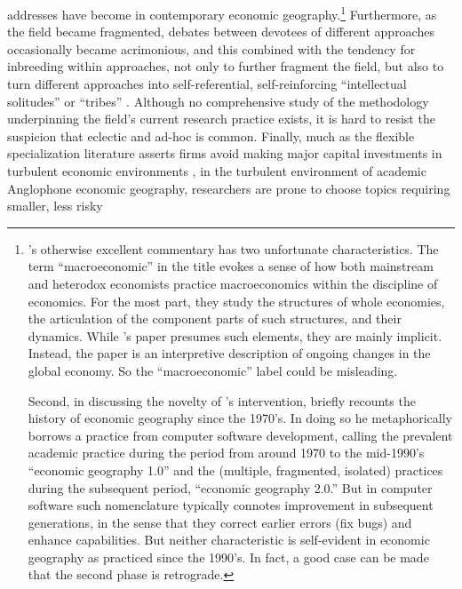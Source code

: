 addresses have become in contemporary economic geography.\footnote{\label{fn:macroeconomic}\citeauthor{peck2016macroeconomic}'s otherwise
excellent commentary has two unfortunate characteristics. The term
``macroeconomic'' in the title evokes a sense of how both mainstream
and heterodox economists practice macroeconomics within the discipline
of economics. For the most part, they study the structures of whole
economies, the articulation of the component parts of such structures,
and their dynamics. While \citeauthor{hudson2016risingpowers}'s paper
presumes such elements, they are mainly implicit. Instead, the paper
is an interpretive description of ongoing changes in the global economy.
So the ``macroeconomic'' label could be misleading.

Second, in discussing the novelty of \citeauthor{hudson2016risingpowers}'s
intervention, \citeauthor{Peck_2016_Macroeconomic} briefly recounts
the history of economic geography since the 1970's. In doing so he
metaphorically borrows a practice from computer software development,
calling the prevalent academic practice during the period from around
1970 to the mid-1990's ``economic geography 1.0'' and the (multiple,
fragmented, isolated) practices during the subsequent period, ``economic
geography 2.0.'' But in computer software such nomenclature typically
connotes improvement in subsequent generations, in the sense that
they correct earlier errors (fix bugs) and enhance capabilities. But
neither characteristic is self-evident in economic geography as practiced
since the 1990's. In fact, a good case can be made that the second
phase is retrograde. } Furthermore, as the field became fragmented, debates between devotees
of different approaches occasionally became acrimonious, and this
combined with the tendency for inbreeding within approaches, not only
to further fragment the field, but also to turn different approaches
into self-referential, self-reinforcing ``intellectual solitudes''
\citep{barnes2010nothing} or ``tribes'' \citep{peck2012economic}.
Although no comprehensive study of the methodology underpinning the
field's current research practice exists, it is hard to resist the
suspicion that eclectic and ad-hoc is common. Finally, much as the
flexible specialization literature asserts firms avoid making major
capital investments in turbulent economic environments \citep{piore1984thesecond},
in the turbulent environment of academic Anglophone economic geography,
researchers are prone to choose topics requiring smaller, less risky
